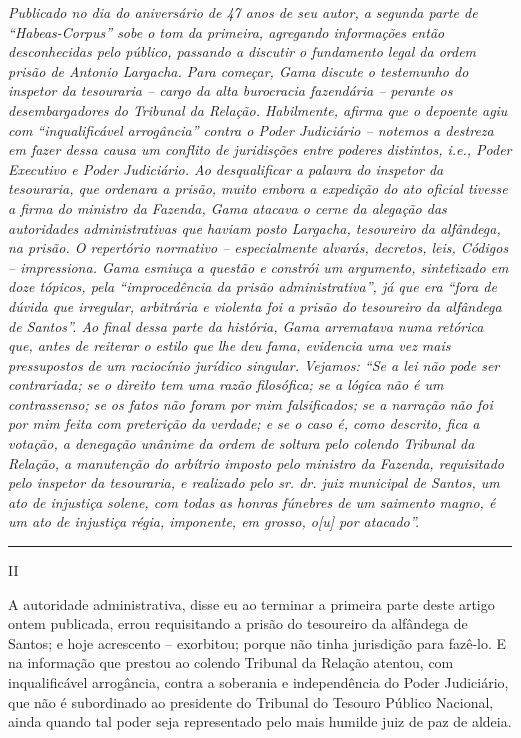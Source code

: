 \emph{Publicado no dia do aniversário de 47 anos de seu autor, a segunda
parte de ``\emph{Habeas-Corpus}'' sobe o tom da primeira, agregando
informações então desconhecidas pelo público, passando a discutir o
fundamento legal da ordem prisão de Antonio Largacha. Para começar, Gama
discute o testemunho do inspetor da tesouraria -- cargo da alta
burocracia fazendária -- perante os desembargadores do Tribunal da
Relação. Habilmente, afirma que o depoente agiu com ``inqualificável
arrogância'' contra o Poder Judiciário -- notemos a destreza em fazer
dessa causa um conflito de juridisções entre poderes distintos, i.e.,
Poder Executivo e Poder Judiciário. Ao desqualificar a palavra do
inspetor da tesouraria, que ordenara a prisão, muito embora a expedição
do ato oficial tivesse a firma do ministro da Fazenda, Gama atacava o
cerne da alegação das autoridades administrativas que haviam posto
Largacha, tesoureiro da alfândega, na prisão. O repertório normativo --
especialmente alvarás, decretos, leis, Códigos -- impressiona. Gama
esmiuça a questão e constrói um argumento, sintetizado em doze tópicos,
pela ``improcedência da prisão administrativa'', já que era ``fora de
dúvida que irregular, arbitrária e violenta foi a prisão do tesoureiro
da alfândega de Santos''. Ao final dessa parte da história, Gama
arrematava numa retórica que, antes de reiterar o estilo que lhe deu
fama, evidencia uma vez mais pressupostos de um raciocínio jurídico
singular. Vejamos: ``Se a lei não pode ser contrariada; se o direito tem
uma razão filosófica; se a lógica não é um contrassenso; se os fatos não
foram por mim falsificados; se a narração não foi por mim feita com
preterição da verdade; e se o caso é, como descrito, fica a votação, a
denegação unânime da ordem de soltura pelo colendo Tribunal da Relação,
a manutenção do arbítrio imposto pelo ministro da Fazenda, requisitado
pelo inspetor da tesouraria, e realizado pelo sr. dr. juiz municipal de
Santos, um ato de injustiça solene, com todas as honras fúnebres de um
saimento magno, é um ato de injustiça régia, imponente, em grosso,
o{[}u{]} por atacado''. }

\begin{center}\rule{0.5\linewidth}{\linethickness}\end{center}

II

A autoridade administrativa, disse eu ao terminar a primeira parte deste
artigo ontem publicada, errou requisitando a prisão do tesoureiro da
alfândega de Santos; e hoje acrescento -- exorbitou; porque não tinha
jurisdição para fazê-lo. E na informação que prestou ao colendo Tribunal
da Relação atentou, com inqualificável arrogância, contra a soberania e
independência do Poder Judiciário, que não é subordinado ao presidente
do Tribunal do Tesouro Público Nacional, ainda quando tal poder seja
representado pelo mais humilde juiz de paz de aldeia.

